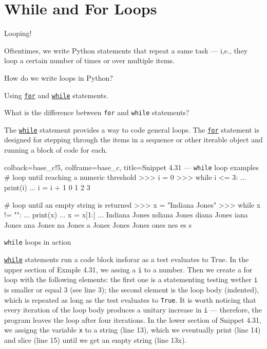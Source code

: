 \documentclass[a4paper,11pt]{book}
\numberwithin{figure}{chapter}
\numberwithin{table}{chapter}
\newcommand{\question}[1]{%
    \begin{tcolorbox}[colback=comp_c!10,colframe=comp_c,sidebyside align=top,width=\linewidth,before skip=1ex]
        #1
    \end{tcolorbox}
    \switchcolumn%
}
\newcommand{\note}[1]{%
    \begin{tcolorbox}[colback=white!0,colframe=white!10,width=\linewidth,before skip=1ex]
        #1
    \end{tcolorbox}
}
\begin{document}
\section{While and For Loops}
\label{sec:while_and_for_loops}

\begin{paracol}{2}
	\question{\raggedright Looping!}
	\note{Oftentimes, we write Python statements that repeat a same task --- i,e., they loop a certain number of times or over multiple items.}
\end{paracol}

\begin{paracol}{2}
	\question{\raggedright How do we write loops in Python?}
	\note{Using \href{https://docs.python.org/3/reference/compound_stmts.html\#for}{\texttt{for}} and \href{https://docs.python.org/3/reference/compound_stmts.html\#while}{\texttt{while}} statements.}
\end{paracol}

\begin{paracol}{2}
	\question{\raggedright What is the difference between \texttt{for} and \texttt{while} statements?}
	\note{The \href{https://docs.python.org/3/reference/compound_stmts.html\#while}{\texttt{while}} statement provides a way to code general loops. The \href{https://docs.python.org/3/reference/compound_stmts.html\#for}{\texttt{for}} statement is designed for stepping through the items in a sequence or other iterable object and running a block of code for each.}
\end{paracol}

\begin{pythoncode}[linenos=true,]{colback=base_c!5, colframe=base_c, title=\sffamily Snippet 4.31 --- \texttt{while} loop examples}
# loop until reaching a numeric threshold
>>> i = 0
>>> while i <= 3:
...     print(i)
...     i = i + 1
0
1
2
3

# loop until an empty string is returned
>>> x = "Indiana Jones"
>>> while x != "":
...     print(x)
...     x = x[1:]
... 
Indiana Jones
ndiana Jones
diana Jones
iana Jones
ana Jones
na Jones
a Jones
 Jones
Jones
ones
nes
es
s
\end{pythoncode}
\clearpage

\begin{paracol}{2}
	\question{\raggedright \texttt{while} loops in action}
	\note{\href{https://docs.python.org/3/reference/compound_stmts.html\#while}{\texttt{while}} statements run a code block insforar as a test evaluates to True. In the upper section of Exmple 4.31, we assing a \texttt{i} to a number. Then we create a for loop with the following elements: the first one is a statementing testing wether \texttt{i} is smaller or equal 3 (see line 3); the second element is the loop body (indented), which is repeated as long as the test evaluates to \texttt{True}. It is worth noticing that every iteration of the loop body produces a unitary increase in \texttt{i} --- therefore, the program leaves the loop after four iterations. In the lower section of Snippet 4.31, we assigng the variable \texttt{x} to a string (line 13), which we eventually print (line 14) and  slice (line 15) until we get an empty string (line 13x).}
\end{paracol}
\end{document}
